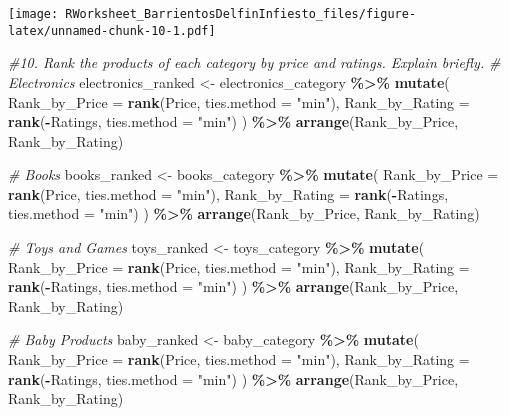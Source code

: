 \documentclass[
]{article}
\newenvironment{Shaded}{\begin{snugshade}}{\end{snugshade}}
\newcommand{\AttributeTok}[1]{\textcolor[rgb]{0.13,0.29,0.53}{#1}}
\newcommand{\CommentTok}[1]{\textcolor[rgb]{0.56,0.35,0.01}{\textit{#1}}}
\newcommand{\FunctionTok}[1]{\textcolor[rgb]{0.13,0.29,0.53}{\textbf{#1}}}
\newcommand{\NormalTok}[1]{#1}
\newcommand{\OtherTok}[1]{\textcolor[rgb]{0.56,0.35,0.01}{#1}}
\newcommand{\SpecialCharTok}[1]{\textcolor[rgb]{0.81,0.36,0.00}{\textbf{#1}}}
\newcommand{\StringTok}[1]{\textcolor[rgb]{0.31,0.60,0.02}{#1}}
\begin{document}
\texttt{[image: RWorksheet\_BarrientosDelfinInfiesto\_files/figure-latex/unnamed-chunk-10-1.pdf]}

\begin{Shaded}
\begin{Highlighting}[]
\CommentTok{\#10. Rank the products of each category by price and ratings. Explain briefly. }
\CommentTok{\# Electronics}
\NormalTok{electronics\_ranked }\OtherTok{\textless{}{-}}\NormalTok{ electronics\_category }\SpecialCharTok{\%\textgreater{}\%}
  \FunctionTok{mutate}\NormalTok{(}
    \AttributeTok{Rank\_by\_Price =} \FunctionTok{rank}\NormalTok{(Price, }\AttributeTok{ties.method =} \StringTok{"min"}\NormalTok{),}
    \AttributeTok{Rank\_by\_Rating =} \FunctionTok{rank}\NormalTok{(}\SpecialCharTok{{-}}\NormalTok{Ratings, }\AttributeTok{ties.method =} \StringTok{"min"}\NormalTok{)}
\NormalTok{  ) }\SpecialCharTok{\%\textgreater{}\%}
  \FunctionTok{arrange}\NormalTok{(Rank\_by\_Price, Rank\_by\_Rating)}

\CommentTok{\# Books}
\NormalTok{books\_ranked }\OtherTok{\textless{}{-}}\NormalTok{ books\_category }\SpecialCharTok{\%\textgreater{}\%}
  \FunctionTok{mutate}\NormalTok{(}
    \AttributeTok{Rank\_by\_Price =} \FunctionTok{rank}\NormalTok{(Price, }\AttributeTok{ties.method =} \StringTok{"min"}\NormalTok{),}
    \AttributeTok{Rank\_by\_Rating =} \FunctionTok{rank}\NormalTok{(}\SpecialCharTok{{-}}\NormalTok{Ratings, }\AttributeTok{ties.method =} \StringTok{"min"}\NormalTok{)}
\NormalTok{  ) }\SpecialCharTok{\%\textgreater{}\%}
  \FunctionTok{arrange}\NormalTok{(Rank\_by\_Price, Rank\_by\_Rating)}

\CommentTok{\# Toys and Games}
\NormalTok{toys\_ranked }\OtherTok{\textless{}{-}}\NormalTok{ toys\_category }\SpecialCharTok{\%\textgreater{}\%}
  \FunctionTok{mutate}\NormalTok{(}
    \AttributeTok{Rank\_by\_Price =} \FunctionTok{rank}\NormalTok{(Price, }\AttributeTok{ties.method =} \StringTok{"min"}\NormalTok{),}
    \AttributeTok{Rank\_by\_Rating =} \FunctionTok{rank}\NormalTok{(}\SpecialCharTok{{-}}\NormalTok{Ratings, }\AttributeTok{ties.method =} \StringTok{"min"}\NormalTok{)}
\NormalTok{  ) }\SpecialCharTok{\%\textgreater{}\%}
  \FunctionTok{arrange}\NormalTok{(Rank\_by\_Price, Rank\_by\_Rating)}

\CommentTok{\# Baby Products}
\NormalTok{baby\_ranked }\OtherTok{\textless{}{-}}\NormalTok{ baby\_category }\SpecialCharTok{\%\textgreater{}\%}
  \FunctionTok{mutate}\NormalTok{(}
    \AttributeTok{Rank\_by\_Price =} \FunctionTok{rank}\NormalTok{(Price, }\AttributeTok{ties.method =} \StringTok{"min"}\NormalTok{),}
    \AttributeTok{Rank\_by\_Rating =} \FunctionTok{rank}\NormalTok{(}\SpecialCharTok{{-}}\NormalTok{Ratings, }\AttributeTok{ties.method =} \StringTok{"min"}\NormalTok{)}
\NormalTok{  ) }\SpecialCharTok{\%\textgreater{}\%}
  \FunctionTok{arrange}\NormalTok{(Rank\_by\_Price, Rank\_by\_Rating)}


\end{Highlighting}
\end{Shaded}
\end{document}
